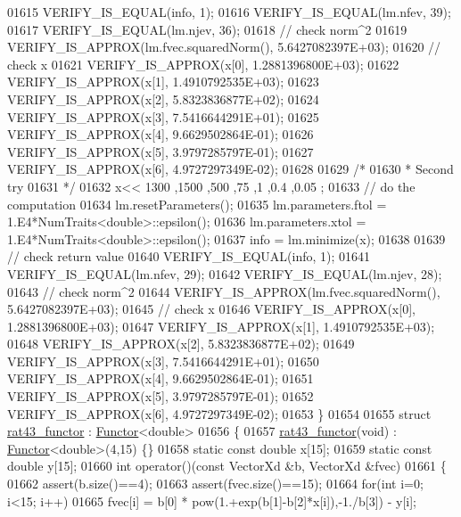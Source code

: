 \begin{DoxyCode}
01615   VERIFY\_IS\_EQUAL(info, 1);
01616   VERIFY\_IS\_EQUAL(lm.nfev, 39);
01617   VERIFY\_IS\_EQUAL(lm.njev, 36);
01618   \textcolor{comment}{// check norm^2}
01619   VERIFY\_IS\_APPROX(lm.fvec.squaredNorm(), 5.6427082397E+03);
01620   \textcolor{comment}{// check x}
01621   VERIFY\_IS\_APPROX(x[0], 1.2881396800E+03);
01622   VERIFY\_IS\_APPROX(x[1], 1.4910792535E+03);
01623   VERIFY\_IS\_APPROX(x[2], 5.8323836877E+02);
01624   VERIFY\_IS\_APPROX(x[3], 7.5416644291E+01);
01625   VERIFY\_IS\_APPROX(x[4], 9.6629502864E-01);
01626   VERIFY\_IS\_APPROX(x[5], 3.9797285797E-01);
01627   VERIFY\_IS\_APPROX(x[6], 4.9727297349E-02);
01628 
01629   \textcolor{comment}{/*}
01630 \textcolor{comment}{   * Second try}
01631 \textcolor{comment}{   */}
01632   x<< 1300 ,1500 ,500  ,75   ,1    ,0.4  ,0.05  ;
01633   \textcolor{comment}{// do the computation}
01634   lm.resetParameters();
01635   lm.parameters.ftol = 1.E4*NumTraits<double>::epsilon();
01636   lm.parameters.xtol = 1.E4*NumTraits<double>::epsilon();
01637   info = lm.minimize(x);
01638 
01639   \textcolor{comment}{// check return value}
01640   VERIFY\_IS\_EQUAL(info, 1);
01641   VERIFY\_IS\_EQUAL(lm.nfev, 29);
01642   VERIFY\_IS\_EQUAL(lm.njev, 28);
01643   \textcolor{comment}{// check norm^2}
01644   VERIFY\_IS\_APPROX(lm.fvec.squaredNorm(), 5.6427082397E+03);
01645   \textcolor{comment}{// check x}
01646   VERIFY\_IS\_APPROX(x[0], 1.2881396800E+03);
01647   VERIFY\_IS\_APPROX(x[1], 1.4910792535E+03);
01648   VERIFY\_IS\_APPROX(x[2], 5.8323836877E+02);
01649   VERIFY\_IS\_APPROX(x[3], 7.5416644291E+01);
01650   VERIFY\_IS\_APPROX(x[4], 9.6629502864E-01);
01651   VERIFY\_IS\_APPROX(x[5], 3.9797285797E-01);
01652   VERIFY\_IS\_APPROX(x[6], 4.9727297349E-02);
01653 \}
01654 
01655 \textcolor{keyword}{struct }\hyperlink{structrat43__functor}{rat43\_functor} : \hyperlink{struct_functor}{Functor}<double>
01656 \{
01657     \hyperlink{structrat43__functor}{rat43\_functor}(\textcolor{keywordtype}{void}) : \hyperlink{struct_functor}{Functor}<double>(4,15) \{\}
01658     \textcolor{keyword}{static} \textcolor{keyword}{const} \textcolor{keywordtype}{double} x[15];
01659     \textcolor{keyword}{static} \textcolor{keyword}{const} \textcolor{keywordtype}{double} y[15];
01660     \textcolor{keywordtype}{int} operator()(\textcolor{keyword}{const} VectorXd &b, VectorXd &fvec)
01661     \{
01662         assert(b.size()==4);
01663         assert(fvec.size()==15);
01664         \textcolor{keywordflow}{for}(\textcolor{keywordtype}{int} i=0; i<15; i++)
01665             fvec[i] = b[0] * pow(1.+exp(b[1]-b[2]*x[i]),-1./b[3]) - y[i];

\end{DoxyCode}
